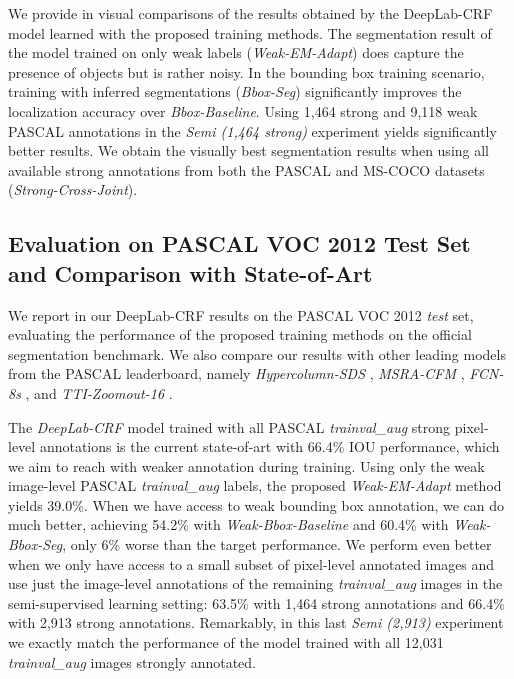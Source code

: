 We provide in  visual comparisons of the
results obtained by the DeepLab-CRF model learned with the proposed
training methods. The segmentation result of the model trained on only
weak labels (\textsl{Weak-EM-Adapt}) does capture the presence of
objects but is rather noisy. In the bounding box training scenario,
training with inferred segmentations (\textsl{Bbox-Seg}) significantly
improves the localization accuracy over \textsl{Bbox-Baseline}. Using
1,464 strong and 9,118 weak PASCAL annotations in the \textsl{Semi
  (1,464 strong)} experiment yields significantly better results. We
obtain the visually best segmentation results when using all available
strong annotations from both the PASCAL and MS-COCO datasets
(\textsl{Strong-Cross-Joint}).

\subsection{Evaluation on PASCAL VOC 2012 Test Set and Comparison with State-of-Art}

We report in  our DeepLab-CRF results on the
PASCAL VOC 2012 \textsl{test} set, evaluating the performance of the
proposed training methods on the official segmentation benchmark. We
also compare our results with other leading models from the PASCAL
leaderboard, namely \textsl{Hypercolumn-SDS}
\citep{hariharan2014hypercolumns}, \textsl{MSRA-CFM}
\citep{dai2014convolutional}, \textsl{FCN-8s} \citep{long2014fully},
and \textsl{TTI-Zoomout-16} \citep{mostajabi2014feedforward}.

The \textsl{DeepLab-CRF} model \citep{chen2014semantic} trained with
all PASCAL \textsl{trainval\_aug} strong pixel-level annotations is
the current state-of-art with 66.4\% IOU performance, which we aim to
reach with weaker annotation during training. Using only the weak
image-level PASCAL \textsl{trainval\_aug} labels, the proposed
\textsl{Weak-EM-Adapt} method yields 39.0\%. When we have access
to weak bounding box annotation, we can do much better, achieving
54.2\% with \textsl{Weak-Bbox-Baseline} and 60.4\% with
\textsl{Weak-Bbox-Seg}, only 6\% worse than the target
performance. We perform even better when we only have access to a
small subset of pixel-level annotated images and use just the
image-level annotations of the remaining \textsl{trainval\_aug}
images in the semi-supervised learning setting: 63.5\% with 1,464
strong annotations and 66.4\% with 2,913 strong
annotations. Remarkably, in this last \textsl{Semi (2,913)} experiment
we exactly match the performance of the model trained with all
12,031 \textsl{trainval\_aug} images strongly annotated.

